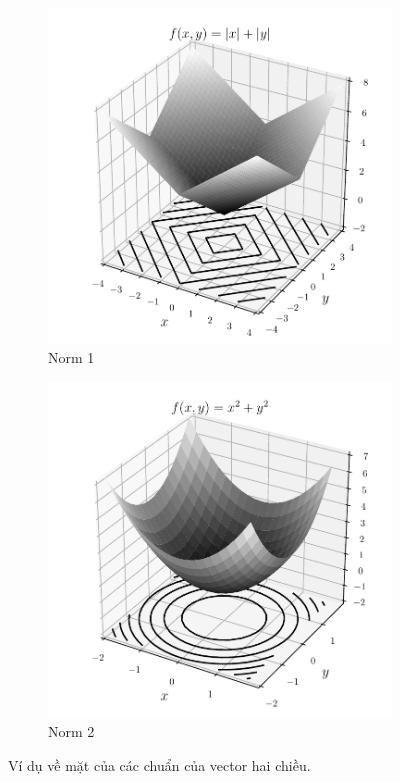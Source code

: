 \begin{figure}[t]
\begin{subfigure}{0.48\textwidth}
\includegraphics[width=0.999\linewidth]{ebookML_src/src/convexity/norm1_surf.pdf}
\caption{Norm 1}
\label{fig:subim1}
\end{subfigure}
\begin{subfigure}{0.48\textwidth}
\includegraphics[width=0.999\linewidth]{ebookML_src/src/convexity/norm2_surf.pdf}
\caption{Norm 2}
\label{fig:subim2}
\end{subfigure}
\caption{Ví dụ về mặt của các chuẩn của vector hai chiều.}
\label{fig:16_norm_surf}
\end{figure}

